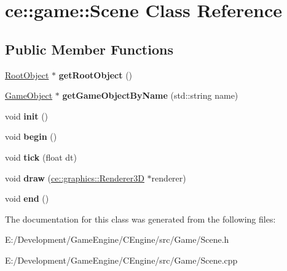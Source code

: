 \hypertarget{classce_1_1game_1_1_scene}{}\section{ce\+:\+:game\+:\+:Scene Class Reference}
\label{classce_1_1game_1_1_scene}
\subsection*{Public Member Functions}
\begin{DoxyCompactItemize}
\item 
\mbox{\label{classce_1_1game_1_1_scene_af074f86055fe90520e256b7361952485}} 
\hyperlink{classce_1_1game_1_1_root_object}{Root\+Object} $\ast$ {\bfseries get\+Root\+Object} ()
\item 
\mbox{\label{classce_1_1game_1_1_scene_a86a48ea15dbe591e51741fba1d7860e4}} 
\hyperlink{classce_1_1game_1_1_game_object}{Game\+Object} $\ast$ {\bfseries get\+Game\+Object\+By\+Name} (std\+::string name)
\item 
\mbox{\label{classce_1_1game_1_1_scene_a77588c7351bc800612fd0ccbcc72c7fc}} 
void {\bfseries init} ()
\item 
\mbox{\label{classce_1_1game_1_1_scene_ab39ffabe8aabb8a79f333a1b893ab8c4}} 
void {\bfseries begin} ()
\item 
\mbox{\label{classce_1_1game_1_1_scene_acddc28540626f6798e1c69dd26fdb1f7}} 
void {\bfseries tick} (float dt)
\item 
\mbox{\label{classce_1_1game_1_1_scene_a3ad7e4aeeabb3d81bb1aca80453c9e7a}} 
void {\bfseries draw} (\hyperlink{classce_1_1graphics_1_1_renderer3_d}{ce\+::graphics\+::\+Renderer3D} $\ast$renderer)
\item 
\mbox{\label{classce_1_1game_1_1_scene_ac3e467b16eef89bcc2737ccc84b42b3e}} 
void {\bfseries end} ()
\end{DoxyCompactItemize}


The documentation for this class was generated from the following files\+:\begin{DoxyCompactItemize}
\item 
E\+:/\+Development/\+Game\+Engine/\+C\+Engine/src/\+Game/Scene.\+h\item 
E\+:/\+Development/\+Game\+Engine/\+C\+Engine/src/\+Game/Scene.\+cpp\end{DoxyCompactItemize}
